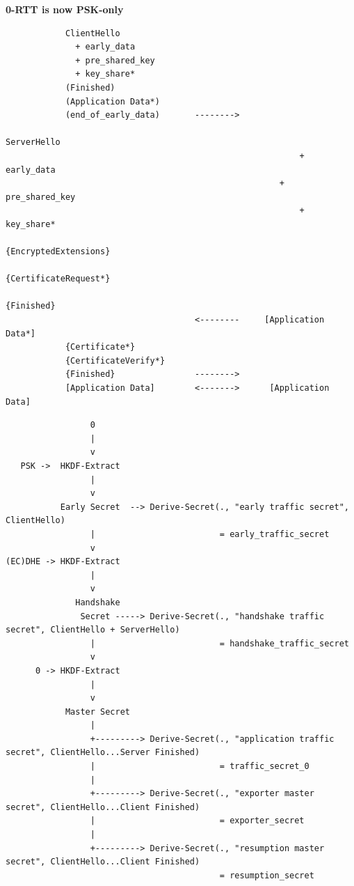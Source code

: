 \documentclass[helvetica]{seminar}
\newcommand{\heading}[1]{%
  \begin{center} 
    \large\bf 
    #1 
  \end{center} 
  \vspace{.4 in}}
\begin{document}
\begin{slide}
\heading{0-RTT is now PSK-only}

\vspace{-3ex}
\begin{scriptsize}
\begin{verbatim}
            ClientHello
              + early_data
              + pre_shared_key
              + key_share*
            (Finished)
            (Application Data*)
            (end_of_early_data)       -------->
                                                            ServerHello
                                                           + early_data
                                                       + pre_shared_key
                                                           + key_share*
                                                  {EncryptedExtensions}
                                                  {CertificateRequest*}
                                                             {Finished}
                                      <--------     [Application Data*]
            {Certificate*}
            {CertificateVerify*}
            {Finished}                -------->
            [Application Data]        <------->      [Application Data]
\end{verbatim}
\end{scriptsize}
\end{slide}

\begin{slide}
\vspace{-8ex}
{\tiny
\begin{verbatim}
                 0
                 |
                 v
   PSK ->  HKDF-Extract
                 |              
                 v
           Early Secret  --> Derive-Secret(., "early traffic secret", ClientHello)
                 |                         = early_traffic_secret
                 v
(EC)DHE -> HKDF-Extract
                 |
                 v
              Handshake
               Secret -----> Derive-Secret(., "handshake traffic secret", ClientHello + ServerHello)
                 |                         = handshake_traffic_secret
                 v
      0 -> HKDF-Extract
                 |
                 v
            Master Secret
                 |
                 +---------> Derive-Secret(., "application traffic secret", ClientHello...Server Finished)
                 |                         = traffic_secret_0
                 |
                 +---------> Derive-Secret(., "exporter master secret", ClientHello...Client Finished)
                 |                         = exporter_secret
                 |
                 +---------> Derive-Secret(., "resumption master secret", ClientHello...Client Finished)
                                           = resumption_secret


\end{verbatim}
}
\end{slide}
\end{document}
